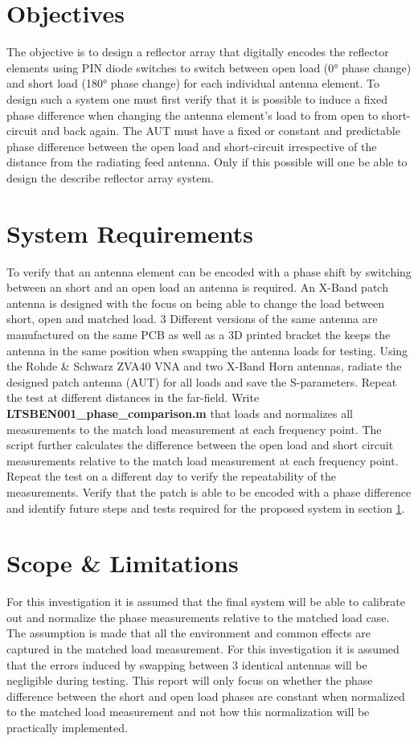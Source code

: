 \section{Objectives}\label{sec:objectives}
The objective is to design a reflector array that digitally encodes the reflector elements using PIN diode switches to switch between open load (0° phase change) and short load (180° phase change) for each individual antenna element. To design such a system one must first verify that it is possible to induce a fixed phase difference when changing the antenna element’s load to from open to short-circuit and back again. The AUT must have a fixed or constant and predictable phase difference between the open load and short-circuit irrespective of the distance from the radiating feed antenna. Only if this possible will one be able to design the describe reflector array system.


\section{System Requirements}
To verify that an antenna element can be encoded with a phase shift by switching between an short and an open load an antenna is required. An X-Band patch antenna is designed with the focus on being able to change the load between short, open and matched load. 3 Different versions of the same antenna are manufactured on the same PCB as well as a 3D printed bracket the keeps the antenna in the same position when swapping the antenna loads for testing. Using the Rohde \& Schwarz ZVA40 VNA and two X-Band Horn antennas, radiate the designed patch antenna (AUT) for all loads and save the S-parameters. Repeat the test at different distances in the far-field. Write \textbf{LTSBEN001\_phase\_comparison.m} that loads and normalizes all measurements to the match load measurement at each frequency point. The script further calculates the difference between the open load and short circuit measurements relative to the match load measurement at each frequency point. Repeat the test on a different day to verify the repeatability of the measurements. Verify that the patch is able to be encoded with a phase difference and identify future steps and tests required for the proposed system in section \ref{sec:objectives}.

\section{Scope \& Limitations}
For this investigation it is assumed that the final system will be able to calibrate out and normalize the phase measurements relative to the matched load case. The assumption is made that all the environment and common effects are captured in the matched load measurement. For this investigation it is assumed that the errors induced by swapping between 3 identical antennas will be negligible during testing. This report will only focus on whether the phase difference between the short and open load phases are constant when normalized to the matched load measurement and not how this normalization will be practically implemented.


